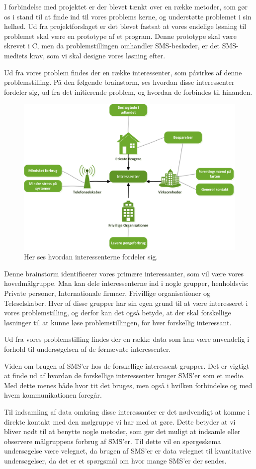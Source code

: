 I forbindelse med projektet er der blevet tænkt over en række metoder, som gør os i stand til at finde ind til vores problems kerne, og understøtte problemet i sin helhed.
Ud fra projektforslaget er det blevet fastsat at vores endelige løsning til problemet skal være en prototype af et program. Denne prototype skal være skrevet i C, men da problemstillingen omhandler SMS-beskeder, er det  SMS-mediets krav, som vi skal designe vores løsning efter.


Ud fra vores problem findes der en række interessenter, som påvirkes af denne problemstilling.
På den følgende brainstorm, ses hvordan disse interessenter fordeler sig, ud fra det initierende problem, og hvordan de forbindes til hinanden.

\begin{figure}[H]
\includegraphics[width=\linewidth]{Billeder/Brainstormting.png}
\caption{Her ses hvordan interessenterne fordeler sig.}
\end{figure}

Denne brainstorm identificerer vores primære interessanter, som vil være vores hovedmålgruppe.
Man kan dele interessenterne ind i nogle grupper, henholdsvis: Private personer, Internationale firmaer, Frivillige organisationer og Teleselskaber.
Hver af disse grupper har sin egen grund til at være interesseret i vores problemstilling, og derfor kan det også betyde, at der skal forskellige løsninger til at kunne løse problemstillingen, for hver forskellig interessant.


Ud fra vores problemstilling findes der en række data som kan være anvendelig i forhold til undersøgelsen af de førnævnte interessenter.


Viden om brugen af SMS'er hos de forskellige interessent grupper.
Det er vigtigt at finde ud af hvordan de forskellige interessenter bruger SMS'er som et medie. Med dette menes både hvor tit det bruges, men også i hvilken forbindelse og med hvem kommunikationen foregår.


Til indsamling af data omkring disse interessanter er det nødvendigt at komme i direkte kontakt med den mølgruppe vi har med at gøre. Dette betyder at vi bliver nødt til at benytte nogle metoder, som gør det muligt at indsamle eller observere målgruppens forbrug af SMS'er.
Til dette vil en spørgeskema undersøgelse være velegnet, da brugen af SMS'er er data velegnet til kvantitative undersøgelser, da det er et spørgsmål om hvor mange SMS'er der sendes.